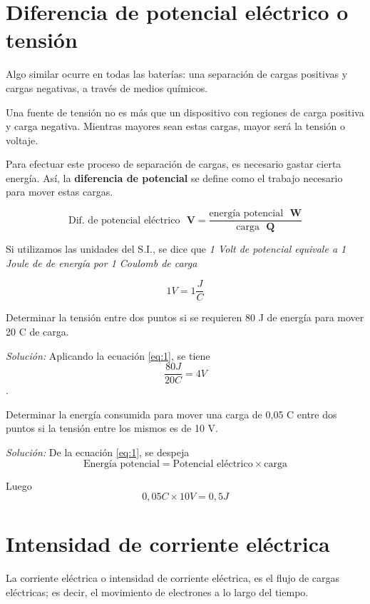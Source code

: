 \section{Diferencia de potencial eléctrico o tensión}

Algo similar ocurre en todas las baterías: una separación de cargas positivas y cargas negativas, a través de medios químicos.

Una fuente de tensión no es más que un dispositivo con regiones de carga positiva y carga negativa. Mientras mayores sean estas cargas, mayor será la tensión o voltaje.

Para efectuar este proceso de separación de cargas, es necesario gastar cierta energía. Así, la \textbf{diferencia de potencial} se define como el trabajo necesario para mover estas cargas.

\begin{equation} \label{eq:1}
  \text{Dif. de potencial eléctrico } \textbf{ V} = \frac{\text{energía potencial }\textbf{ W}}{\text{carga }\textbf{ Q}}
\end{equation}


Si utilizamos las unidades del S.I., se dice que \textit{1 Volt de potencial equivale a 1 Joule de de energía por 1 Coulomb de carga}

$$ 1 V = 1 \frac{J}{C} $$

\begin{ejemplo}
	Determinar la tensión entre dos puntos si se requieren 80 J de energía para mover 20 C de carga.
	
	\emph{Solución:} Aplicando la ecuación \ref{eq:1}, se tiene $$ \frac{80J}{20C}=4V $$.
\end{ejemplo}

\begin{ejemplo}
	Determinar la energía consumida para mover una carga de 0,05 C entre dos puntos si la tensión entre los mismos es de 10 V.
	
	\emph{Solución:} De la ecuación \ref{eq:1}, se despeja $$ \text{Energía potencial} = \text{Potencial eléctrico} \times \text{carga} $$
	
	Luego $$ 0,05C \times 10V = 0,5 J $$
\end{ejemplo}

\section{Intensidad de corriente eléctrica}

La corriente eléctrica o intensidad de corriente eléctrica, es el flujo de cargas eléctricas; es decir, el movimiento de electrones a lo largo del tiempo.

